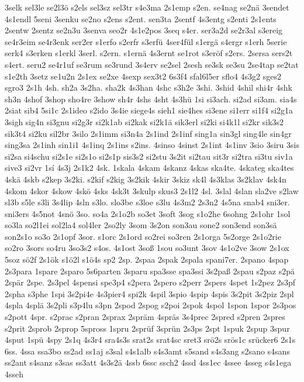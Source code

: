 {3selk
sel3le
se2l3ö
s2els
sel3sz
sel3tr
s4e3ma
2s1emp
s2en.
se4nag
se2nä
3sendet
4s1endl
5seni
3senku
se2no
s2ens
s2ent.
sen3ta
2sentf
4s3entg
s2enti
2s1ents
2sentw
2sentz
se2n3u
3senva
seo2r
4s1e2pos
3seq
s4er.
ser3a2d
se2r3al
s3ereig
se4r3eim
se4r3enk
ser2er
s1erfo
s2erfr
s3erfü
4ser4fül
s1ergä
s4ergr
s1erh
5serie
serk4
s3erken
s1erkl
3serl.
s2ern.
s1ernä
4s3ernt
se1rot
s3eröf
s2ers.
2sersa
sers2t
s4ert.
seru2
se4r1uf
se3rum
se3rund
3s4erv
se2sel
2sesh
se3sk
se3su
2se4tap
se2tat
s1e2th
3setz
se1u2n
2s1ex
se2xe
4sexp
sex3t2
6s3f4
sfal6l5er
sflo4
4s3g2
sges2
sgro3
2s1h
4sh.
sh2a
3s2ha.
sha2k
4s3han
4shc
s3h2e
3shi.
3shid
4shil
shi4r
4shk
sh3n
4shof
3shop
sho4re
3show
sh4r
4shs
4sht
4s3hü
1si
si3ach.
si2ad
si3am.
sia4s
2siat
sib4
5si1c
2s1ideo
s2ido
3s4ie
siege4s
sieh1
sie4hes
si3ene
si1err
si1f4
si2g1a
3sigh
sig4n
si3gnu
si2g3r
si2k1ab
si2kak
si2k1ä
sik3erl
si2ki
si4k1l
si2kr
sik3s2
sik3t4
si2ku
sil2br
3silo
2s1imm
si3n4a
2s1ind
2s1inf
sing1a
sin3gl
sing4le
sin4gr
sing3sa
2s1inh
sin1i1
4s1inq
2s1ins
s2ins.
4sinso
4sinst
2s1int
4s1inv
3sio
3siru
3sis
si2sa
si4schu
si2s1e
si2s1o
si2s1p
sis3s2
si2stu
3s2it
si2tau
sit3r
si2tra
si3tu
siv1a
sive3
si2vr
1sí
4s3j
2s1k2
4sk.
1skala
4skam
4skanz
4skas
ska4te.
4skateg
ska4tes
4skä
4skb
s2kep
3s2ki.
s2kif
s2kig
3s2kik
4skir
3skiz
sk4l
4s3klas
3s2klav
4sk4n
4skom
4skor
4skow
4skö
4sks
4sk3t
3skulp
skus3
2s1l2
4sl.
3slal
4slan
sla2ve
s2law
sl3b
s5le
s3li
3s4lip
4sln
s3lo.
slo3be
s3loe
s3lu
4s3m2
2s3n2
4s5na
snab4
sni3er.
sni3ers
4s5not
4snö
3so.
so4a
2s1o2b
so3et
3soft
3sog
s1o2he
6sohng
2s1ohr
1sol
so3la
so2l1ei
sol2la4
sol4ler
2so2ly
3som
3s2on
son3au
sone2
son3end
son3sä
son2s1o
so3o
2s1opf
3sor.
s1orc
2s1ord
so2rei
so3ren
2s1orga
5s2orge
2s1o2rie
so2ro
3sors
so4ru
3so3s2
s4os.
4s1ost
3soß
1sou
so3unt
3sov
4s1o2ve
3sow
2s1ox
5soz
sö2f
2s1ök
s1ö2l
s1ö4s
sp2
2sp.
2spaa
2spak
2spala
spani7er.
2spano
4spap
2s3para
1spare
2sparo
5s6parten
3sparu
spa3sse
spa3ssi
3s2paß
2spau
s2paz
s2pä
2spär
2spe.
2s3pel
4spensi
spe3p4
s2pera
2spero
s2perr
2spers
4spet
1s2pez
2s3pf
2spha
s3phe
1spi
3s2pi4e
4s3pier4
spi2k
4spil
3spio
4spip
4spis
3s2pit
3s2piz
2spl
4spla
4splä
3s2pli
s3p4lu
s3pn
2spod
2spog
s2poi
2spok
4spol
1spon
1spor
2s3pos
s2pott
4spr.
s2prac
s2pran
2sprax
2spräm
4spräs
3s4prec
2spred
s2pren
2spres
s2prit
2sprob
2sprop
5spross
1spru
2sprüf
3sprün
2s3ps
2spt
1spuk
2spup
3spur
4sput
1spü
4spy
2s1q
4s3r4
sra4s3s
srat2s
srat4sc
sret3
srö2s
srös1c
srücker6
2s1s
6ss.
4ssa
ssa3bo
ss2ad
ss1aj
s3sal
s4s1alb
s4s3amt
s5sand
s4s3ang
s2sano
s4sans
ss2ant
s4sanz
s3sas
ss3att
4s3s2ä
4ssb
6ssc
ssch2
4ssd
4ss1ec
4ssee
4sseg
s4s1ega
4sseh
}
